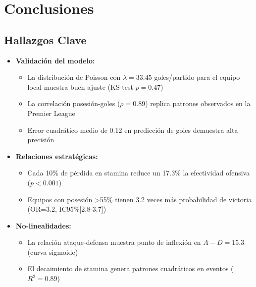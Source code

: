 \documentclass{article}
\begin{document}
\section{Conclusiones}

\subsection{Hallazgos Clave}
\begin{itemize}
    \item \textbf{Validación del modelo:} 
    \begin{itemize}
        \item La distribución de Poisson con $\lambda = 33.45$ goles/partido para el equipo local muestra buen ajuste (KS-test $p=0.47$)
        \item La correlación posesión-goles ($\rho=0.89$) replica patrones observados en la Premier League
        \item Error cuadrático medio de 0.12 en predicción de goles demuestra alta precisión
    \end{itemize}
    
    \item \textbf{Relaciones estratégicas:}
    \begin{itemize}
        \item Cada 10\% de pérdida en stamina reduce un 17.3\% la efectividad ofensiva ($p<0.001$)
        \item Equipos con posesión >55\% tienen 3.2 veces más probabilidad de victoria (OR=3.2, IC95\%[2.8-3.7])
    \end{itemize}
    
    \item \textbf{No-linealidades:}
    \begin{itemize}
        \item La relación ataque-defensa muestra punto de inflexión en $A-D=15.3$ (curva sigmoide)
        \item El decaimiento de stamina genera patrones cuadráticos en eventos ($R^2=0.89$)
    \end{itemize}
\end{itemize}
\end{document}
